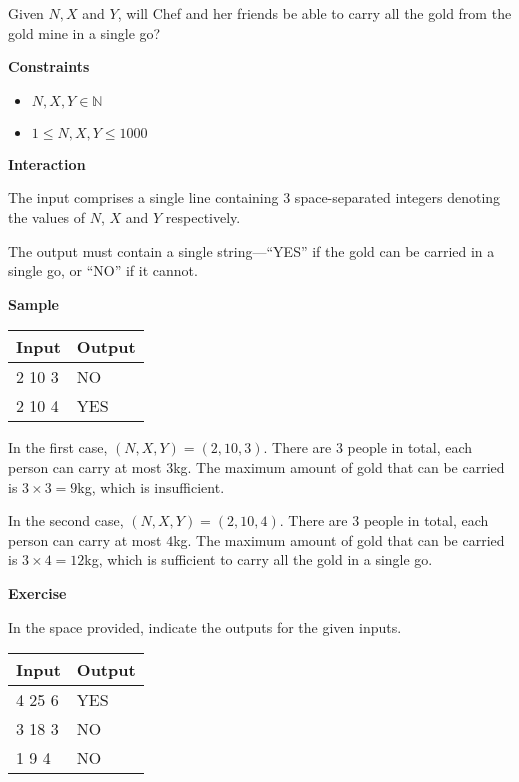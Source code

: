 \documentclass[a4paper]{exam}
\newcommand\heading[1]{\textbf{#1}}
\newcommand\inn{\in \mathbb{N}}
\begin{document}
\begin{questions}
    Given $N,X$ and $Y$, will Chef and her friends be able to carry all the gold from the gold mine in a single go?


    \heading{Constraints}
    \begin{itemize}
        \item  $N,X,Y\inn$
        \item  $1\le N,X,Y\le1000$
    \end{itemize}


    \heading{Interaction}

    The input comprises a single line containing 3 space-separated integers denoting the values of $N$, $X$ and $Y$ respectively.

    The output must contain a single string---``YES'' if the gold can be carried in a single go, or ``NO'' if it cannot.

    \heading{Sample}

    \begin{tabularx}{\textwidth}{|X|X|}
        \rowcolor{gray!50}
        \hline
        Input  & Output \\ \hline\hline
        2 10 3 & NO     \\\hline
        2 10 4 & YES    \\\hline
    \end{tabularx}

    In the first case, $(N,X,Y) = (2,10,3)$. There are $3$ people in total, each person can carry at most  $3$kg. The maximum amount of gold that can be carried is $3\times3=9$kg, which is insufficient.

    In the second case, $(N,X,Y) = (2,10,4)$. There are $3$ people in total, each person can carry at most  $4$kg. The maximum amount of gold that can be carried is $3\times4=12$kg, which is sufficient to carry all the gold in a single go.

    \heading{Exercise}

    In the space provided, indicate the outputs for the given inputs.

    \begin{tabularx}{\textwidth}{|X|X|}
        \rowcolor{gray!50}
        \hline
        Input  & Output \\ \hline\hline
        4 25 6 & YES    \\\hline
        3 18 3 & NO     \\\hline
        1 9 4  & NO     \\\hline
    \end{tabularx}


\end{questions}
\end{document}

